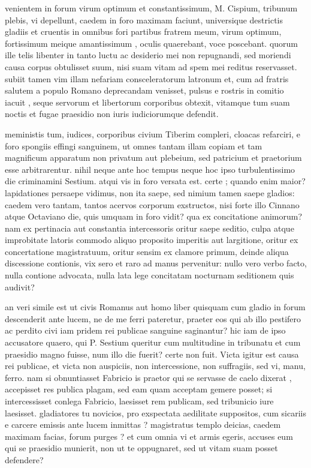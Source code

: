  venientem in forum virum optimum et constantissimum, M. Cispium, tribunum plebis, vi depellunt, caedem in foro maximam faciunt, universique destrictis gladiis et cruentis in omnibus fori partibus fratrem meum, virum optimum, fortissimum meique amantissimum , oculis quaerebant, voce poscebant. quorum ille telis libenter in tanto luctu ac desiderio mei non repugnandi, sed moriendi causa corpus obtulisset suum, nisi suam vitam ad spem mei reditus reservasset. subiit tamen vim illam nefariam consceleratorum latronum et, cum ad fratris salutem a populo Romano deprecandam venisset, pulsus e rostris in comitio iacuit , seque servorum et libertorum corporibus obtexit, vitamque tum suam noctis et fugae praesidio non iuris iudiciorumque defendit.

 meministis tum, iudices, corporibus civium Tiberim compleri, cloacas refarciri, e foro spongiis effingi sanguinem, ut omnes tantam illam copiam et tam magnificum apparatum non privatum aut plebeium, sed patricium et praetorium esse arbitrarentur. nihil neque ante hoc tempus neque hoc ipso turbulentissimo die criminamini Sestium. atqui vis in foro versata est. certe ; quando enim maior? lapidationes persaepe vidimus, non ita saepe, sed nimium tamen saepe gladios: caedem vero tantam, tantos acervos corporum exstructos, nisi forte illo Cinnano atque Octaviano die, quis umquam in foro vidit? qua ex concitatione animorum? nam ex pertinacia aut constantia intercessoris oritur saepe seditio, culpa atque improbitate latoris commodo aliquo proposito imperitis aut largitione, oritur ex concertatione magistratuum, oritur sensim ex clamore primum, deinde aliqua discessione contionis, vix sero et raro ad manus pervenitur: nullo vero verbo facto, nulla contione advocata, nulla lata lege concitatam nocturnam seditionem quis audivit?

 an veri simile est ut civis Romanus aut homo liber quisquam cum gladio in forum descenderit ante lucem, ne de me ferri pateretur, praeter eos qui ab illo pestifero ac perdito civi iam pridem rei publicae sanguine saginantur? hic iam de ipso accusatore quaero, qui P. Sestium queritur cum multitudine in tribunatu et cum praesidio magno fuisse, num illo die fuerit? certe non fuit. Victa igitur est causa rei publicae, et victa non auspiciis, non intercessione, non suffragiis, sed vi, manu, ferro. nam si obnuntiasset Fabricio is praetor qui se servasse de caelo dixerat , accepisset res publica plagam, sed eam quam acceptam gemere posset; si intercessisset conlega Fabricio, laesisset rem publicam, sed tribunicio iure laesisset. gladiatores tu novicios, pro exspectata aedilitate suppositos, cum sicariis e carcere emissis ante lucem inmittas ? magistratus templo deicias, caedem maximam facias, forum purges ? et cum omnia vi et armis egeris, accuses eum qui se praesidio munierit, non ut te oppugnaret, sed ut vitam suam posset defendere?

